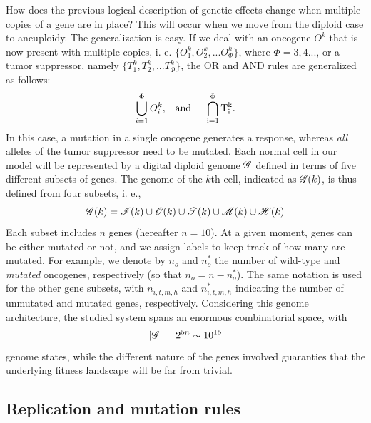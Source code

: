 \documentclass[10pt, aps, rmp,  twocolumn, superscriptaddress, floatfix, showkeys]{revtex4-2}
\begin{document}
How does the previous logical description of genetic effects change when multiple copies of a gene are in place? This will occur when we move from the diploid case to aneuploidy. The generalization is easy. If we deal with an oncogene $O^k$ that is now present with multiple copies, i. e. $\{ O_1^k, O_2^k, ... O_{\Phi}^k \}$, where $\Phi=3,4...$, or a tumor suppressor, namely $\{ T_1^k, T_2^k, ... T_{\Phi}^k \}$, the OR and AND rules are generalized as follows:
\begin{equation}
\bigcup_{i=1}^{\Phi} O_i^k, \; \; \; \rm{and} \; \; \;\; \; \bigcap_{i=1}^{\Phi} T_i^k. 
\end{equation}
In this case, a mutation in a single oncogene generates a response, whereas {\it all} alleles of the tumor suppressor need to be mutated. Each normal cell in our model will be represented by a digital diploid genome $\cal G$ defined in terms of five different subsets of genes. The genome of the $k$th cell, indicated as ${\cal G}(k)$, is thus defined from four subsets, i. e.,
\begin{equation}
{\cal G} (k)={\cal I}(k)\cup{\cal O}(k)\cup{\cal T}(k)\cup{\cal M}(k)\cup{\cal H}(k)
\end{equation}
Each subset includes $n$ genes (hereafter $n = 10$). At a given moment, genes can be either mutated or not, and we assign labels to keep track of how many are mutated. For example, we denote by $n_o$ and $n^*_o$ the number of wild-type and \textit{mutated} oncogenes, respectively (so that $n_o = n - n^*_o$). The same notation is used for the other gene subsets, with $n_{i,t,m,h}$ and $n^*_{i,t,m,h}$ indicating the number of unmutated and mutated genes, respectively. Considering this genome architecture, the studied system spans an enormous combinatorial space, with $$\vert {\cal G} \vert = 2^{5n} \sim 10^{15}$$ genome states, while the different nature of the genes involved guaranties that the underlying fitness landscape will be far from trivial. 


 
\subsection*{Replication and mutation rules}
\end{document}
